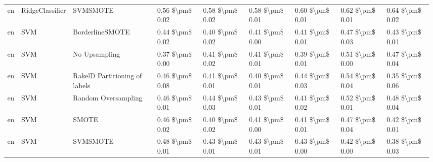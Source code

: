 \begin{tabular}{lllllllll}
      en &                 RidgeClassifier &                      SVMSMOTE &     0.56 \$\textbackslash pm\$ 0.02 &           0.58 \$\textbackslash pm\$ 0.02 &       0.58 \$\textbackslash pm\$ 0.01 &        0.60 \$\textbackslash pm\$ 0.01 &                         0.62 \$\textbackslash pm\$ 0.01 &     0.64 \$\textbackslash pm\$ 0.02 \\
      en &                             SVM &               BorderlineSMOTE &     0.44 \$\textbackslash pm\$ 0.02 &           0.40 \$\textbackslash pm\$ 0.02 &       0.41 \$\textbackslash pm\$ 0.00 &        0.41 \$\textbackslash pm\$ 0.01 &                         0.47 \$\textbackslash pm\$ 0.03 &     0.43 \$\textbackslash pm\$ 0.01 \\
      en &                             SVM &                 No Upsampling &     0.37 \$\textbackslash pm\$ 0.00 &           0.41 \$\textbackslash pm\$ 0.02 &       0.41 \$\textbackslash pm\$ 0.01 &        0.39 \$\textbackslash pm\$ 0.01 &                         0.51 \$\textbackslash pm\$ 0.00 &     0.47 \$\textbackslash pm\$ 0.04 \\
      en &                             SVM & RakelD Partitioning of labels &     0.46 \$\textbackslash pm\$ 0.08 &           0.41 \$\textbackslash pm\$ 0.01 &       0.40 \$\textbackslash pm\$ 0.01 &        0.44 \$\textbackslash pm\$ 0.03 &                         0.54 \$\textbackslash pm\$ 0.04 &     0.35 \$\textbackslash pm\$ 0.06 \\
      en &                             SVM &           Random Oversampling &     0.46 \$\textbackslash pm\$ 0.01 &           0.44 \$\textbackslash pm\$ 0.03 &       0.43 \$\textbackslash pm\$ 0.01 &        0.41 \$\textbackslash pm\$ 0.02 &                         0.52 \$\textbackslash pm\$ 0.01 &     0.48 \$\textbackslash pm\$ 0.04 \\
      en &                             SVM &                         SMOTE &     0.46 \$\textbackslash pm\$ 0.02 &           0.40 \$\textbackslash pm\$ 0.02 &       0.41 \$\textbackslash pm\$ 0.00 &        0.41 \$\textbackslash pm\$ 0.01 &                         0.47 \$\textbackslash pm\$ 0.04 &     0.42 \$\textbackslash pm\$ 0.01 \\
      en &                             SVM &                      SVMSMOTE &     0.48 \$\textbackslash pm\$ 0.01 &           0.43 \$\textbackslash pm\$ 0.01 &       0.43 \$\textbackslash pm\$ 0.01 &        0.43 \$\textbackslash pm\$ 0.00 &                         0.42 \$\textbackslash pm\$ 0.00 &     0.38 \$\textbackslash pm\$ 0.03 \\

\end{tabular}
